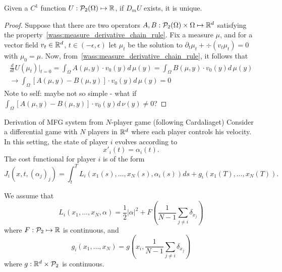 \begin{proposition}
    Given a $C^1$ function $U : \mathcal{P}_2(\Omega) \mapsto \mathbb{R}$,
    if $D_m U$ exists, it is unique.
\end{proposition}
\begin{proof}
    Suppose that there are two operators 
    $A, B: \mathcal{P}_2(\Omega) \times \Omega \mapsto \mathbb{R}^d$
    satisfying the property~\eqref{wass:measure_derivative_chain_rule}.
    Fix a measure $\mu$, and for a vector field 
    $v_t \in \mathbb{R}^d$, $t \in (-\epsilon, \epsilon)$
    let $\mu_t$ be the solution to $\partial_t \mu_t + \div(v_t \mu_t) = 0$
    with $\mu_0 = \mu$.
    Now, from~\eqref{wass:measure_derivative_chain_rule}, it follows that
    \begin{align*}
    \frac{d}{dt} U(\mu_t) |_{t = 0} = \int_\Omega A(\mu, y) \cdot v_0(y) d\, \mu(y) = \int_\Omega B(\mu, y) \cdot v_0(y) d\, \mu(y)\\
    \rightarrow \int_\Omega [A(\mu, y) - B(\mu, y)]  \cdot v_0(y) d\, \mu(y) = 0
    \end{align*}
    Note to self: maybe not so simple - what if $\int_\Omega [A(\mu, y) - B(\mu, y)]  \cdot v_0(y) d\, \nu(y) \neq 0$?

\end{proof}


Derivation of MFG system from $N$-player game (following Cardaliaget)
Consider a differential game with $N$ players in $\mathbb{R}^d$ where each player
controls his velocity. In this setting, the state of player $i$
 evolves according to
\begin{equation}
    x'_i(t) = \alpha_i(t).
\end{equation}
The cost functional for player $i$ is of the form
\begin{equation}
    J_i(x, t, (\alpha_j)_j) = \int_t^T L_i (x_1(s), \dots, x_N(s), \alpha_i(s)) ds + g_i(x_1(T), \dots, x_N(T)).
\end{equation}

We assume that
\begin{equation}
    L_i(x_1, \dots, x_N, \alpha) = \frac{1}{2}|\alpha|^2 + F\left( \frac{1}{N-1} \sum_{j \neq i} \delta_{x_j}  \right)
\end{equation}
where $F : \mathcal{P}_2 \mapsto \mathbb{R}$ is continuous, and
\begin{equation}
    g_i(x_1, \dots, x_N) = g(x_i, \frac{1}{N-1} \sum_{j\neq i} \delta_{x_j})
\end{equation}
where $g: \mathbb{R}^d \times \mathcal{P}_2$ is continuous.

